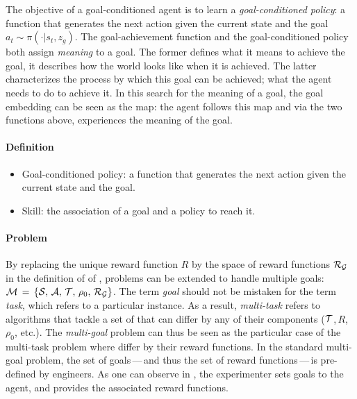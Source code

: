 The objective of a goal-conditioned agent is to learn a \textit{goal-conditioned policy}: a function that generates the next action given the current state and the goal $a_t \sim \pi(\cdot|s_t,z_g)$. The goal-achievement function and the goal-conditioned policy both assign \textit{meaning} to a goal. The former defines what it means to achieve the goal, it describes how the world looks like when it is achieved. The latter characterizes the process by which this goal can be achieved; what the agent needs to do to achieve it. In this search for the meaning of a goal, the goal embedding can be seen as the map: the agent follows this map and via the two functions above, experiences the meaning of the goal.

\begin{tcolorbox}
\small
\paragraph{Definition}
\begin{itemize}
    \item \gls{Goal-conditioned policy}: a function that generates the next action given the current
state and the goal.
	\item \gls{Skill}:  the association of a goal and a policy to reach it.
\end{itemize}
\end{tcolorbox}

\paragraph{Problem}

By replacing the unique reward function $R$ by the space of reward functions $\mathcal{R}_{\mathcal{G}}$ in the definition of \mdp of , \rl problems can be extended to handle multiple goals: $\mathcal{M}\,=\,\{\mathcal{S},\,\mathcal{A},\,\mathcal{T},\,\rho_0,\,\mathcal{R}_{\mathcal{G}}\}$. The term \textit{goal} should not be mistaken for the term \textit{task}, which refers to a particular \mdp instance. As a result, \textit{multi-task} \rl refers to \rl algorithms that tackle a set of \mdps that can differ by any of their components (\eg $\mathcal{T}$,\,$R$,\,$\rho_0$, etc.). The \textit{multi-goal} \rl problem can thus be seen as the particular case of the multi-task \rl problem where \mdps differ by their reward functions. In the standard multi-goal \rl problem, the set of goals\,---\,and thus the set of reward functions\,---\,is pre-defined by engineers. As one can observe in , the experimenter sets goals to the agent, and provides the associated reward functions. 


